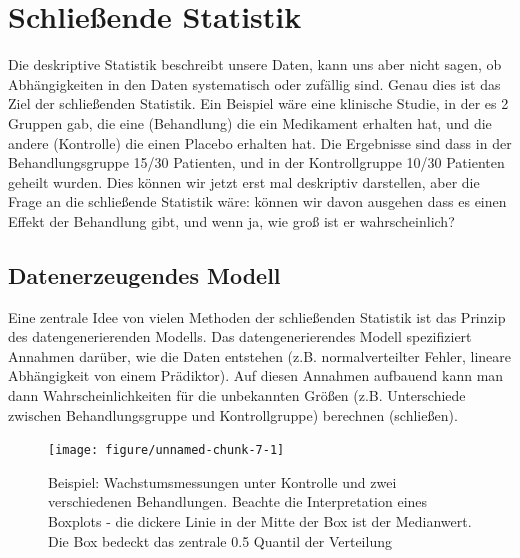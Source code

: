 \documentclass[a4paper,twoside]{tufte-book}\usepackage[]{graphicx}\usepackage[]{color}
\begin{document}
\chapter{Schließende Statistik}\label{ch: inductive statistics}


Die deskriptive Statistik beschreibt unsere Daten, kann uns aber nicht sagen, ob Abhängigkeiten in den Daten systematisch oder zufällig sind. Genau dies ist das Ziel der schließenden Statistik. Ein Beispiel wäre eine klinische Studie, in der es 2 Gruppen gab, die eine (Behandlung) die ein Medikament erhalten hat, und die andere (Kontrolle) die einen Placebo erhalten hat. Die Ergebnisse sind dass in der Behandlungsgruppe 15/30 Patienten, und in der Kontrollgruppe 10/30 Patienten geheilt wurden. Dies können wir jetzt erst mal deskriptiv darstellen, aber die Frage an die schließende Statistik wäre: können wir davon ausgehen dass es einen Effekt der Behandlung gibt, und wenn ja, wie groß ist er wahrscheinlich?


\section{Datenerzeugendes Modell}


Eine zentrale Idee von vielen Methoden der schließenden Statistik ist das Prinzip des datengenerierenden Modells. Das datengenerierendes Modell spezifiziert Annahmen darüber, wie die Daten entstehen (z.B. normalverteilter Fehler, lineare Abhängigkeit von einem Prädiktor). Auf diesen Annahmen aufbauend kann man dann Wahrscheinlichkeiten für die unbekannten Größen (z.B. Unterschiede zwischen Behandlungsgruppe und Kontrollgruppe) berechnen (schließen).

\begin{figure}[htbp]
\begin{center}
\begin{Schunk}

\texttt{[image: figure/unnamed-chunk-7-1]} \end{Schunk}

\caption{Beispiel: Wachstumsmessungen unter Kontrolle und zwei verschiedenen Behandlungen. Beachte die Interpretation eines Boxplots - die dickere Linie in der Mitte der Box ist der Medianwert. Die Box bedeckt das zentrale 0.5 Quantil der Verteilung}\label{fig: plant growth music}
\end{center}
\end{figure}
\end{document}
